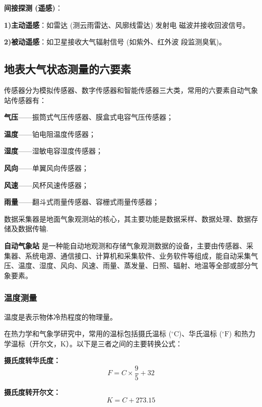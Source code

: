 \documentclass[12pt,a4paper]{article}
\begin{document}
	\textbf{间接探测 (遥感)}：
	
	\textbf{1)主动遥感}：如雷达 (测云雨雷达、风廓线雷达) 发射电
	磁波并接收回波信号。
	
	\textbf{2)被动遥感}：如卫星接收大气辐射信号 (如紫外、红外波
	段监测臭氧)。
	
	\subsection{地表大气状态测量的六要素}
	
	传感器分为模拟传感器、数字传感器和智能传感器三大类，常用的六要素自动气象站传感器有：
	
	\textbf{气压}——振筒式气压传感器、膜盒式电容气压传感器；
	
	\textbf{温度}——铂电阻温度传感器；
	
	\textbf{湿度}——湿敏电容湿度传感器；
	
	\textbf{风向}——单翼风向传感器；
	
	\textbf{风速}——风杯风速传感器；
	
	\textbf{雨量}——翻斗式雨量传感器、容栅式雨量传感器；
	
	数据采集器是地面气象观测站的核心，其主要功能是数据采样、数据处理、数据存储及数据传输.
	
	\textbf{自动气象站} 是一种能自动地观测和存储气象观测数据的设备，主要由传感器、采集器、系统电源、通信接口、计算机和采集软件、业务软件等组成，能自动采集气压、温度、湿度、风向、风速、雨量、蒸发量、日照、辐射、地温等全部或部分气象要素。
	
	\subsubsection{温度测量}
	温度是表示物体冷热程度的物理量。
	
	在热力学和气象学研究中，常用的温标包括摄氏温标 ($^{\circ}\text{C}$)、华氏温标 ($^{\circ}\text{F}$) 和热力学温标（开尔文，$\text{K}$）。以下是三者之间的主要转换公式：
	
			\textbf{摄氏度转华氏度：}
			$$F = C \times \frac{9}{5} + 32$$
			
			\textbf{摄氏度转开尔文：}
			$$	K = C + 273.15$$
			
\end{document}
